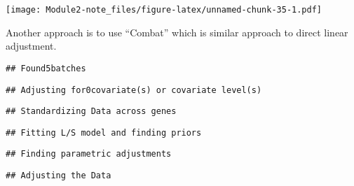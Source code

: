 \documentclass[]{article}
\newenvironment{Shaded}{\begin{snugshade}}{\end{snugshade}}
\newcommand{\KeywordTok}[1]{\textcolor[rgb]{0.13,0.29,0.53}{\textbf{#1}}}
\newcommand{\DataTypeTok}[1]{\textcolor[rgb]{0.13,0.29,0.53}{#1}}
\newcommand{\DecValTok}[1]{\textcolor[rgb]{0.00,0.00,0.81}{#1}}
\newcommand{\StringTok}[1]{\textcolor[rgb]{0.31,0.60,0.02}{#1}}
\newcommand{\OtherTok}[1]{\textcolor[rgb]{0.56,0.35,0.01}{#1}}
\newcommand{\OperatorTok}[1]{\textcolor[rgb]{0.81,0.36,0.00}{\textbf{#1}}}
\newcommand{\NormalTok}[1]{#1}
\begin{document}
\texttt{[image: Module2-note\_files/figure-latex/unnamed-chunk-35-1.pdf]}

Another approach is to use ``Combat'' which is similar approach to
direct linear adjustment.

\begin{Shaded}
\end{Shaded}

\begin{verbatim}
## Found5batches
\end{verbatim}

\begin{verbatim}
## Adjusting for0covariate(s) or covariate level(s)
\end{verbatim}

\begin{verbatim}
## Standardizing Data across genes
\end{verbatim}

\begin{verbatim}
## Fitting L/S model and finding priors
\end{verbatim}

\begin{verbatim}
## Finding parametric adjustments
\end{verbatim}

\begin{verbatim}
## Adjusting the Data
\end{verbatim}

\begin{Shaded}
\end{Shaded}
\end{document}
